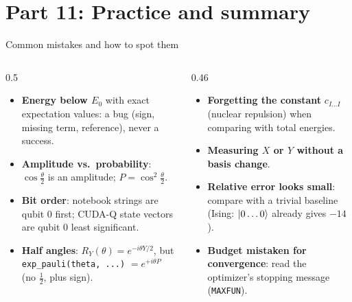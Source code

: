 \documentclass[aspectratio=169,11pt]{beamer}
\newcommand{\key}[1]{{\color{qdark}\textbf{#1}}}
\begin{document}
\section{Part 11: Practice and summary}
\begin{frame}{Common mistakes and how to spot them}
  \begin{columns}[T]
    \begin{column}{0.5\textwidth}
      \small
      \begin{itemize}
        \item \key{Energy below $E_0$} with exact expectation values: a bug (sign, missing term, reference), never a success.
        \item \key{Amplitude vs.\ probability}: $\cos\frac\theta2$ is an amplitude; $P = \cos^2\frac\theta2$.
        \item \key{Bit order}: notebook strings are qubit 0 first; CUDA-Q state vectors are qubit 0 least significant.
        \item \key{Half angles}: $R_Y(\theta) = e^{-i\theta Y/2}$, but \texttt{exp\_pauli(theta, ...)} $= e^{+i\theta P}$ (no $\frac12$, plus sign).
      \end{itemize}
    \end{column}
    \begin{column}{0.46\textwidth}
      \small
      \begin{itemize}
        \item \key{Forgetting the constant} $c_{I\dots I}$ (nuclear repulsion) when comparing with total energies.
        \item \key{Measuring $X$ or $Y$ without a basis change}.
        \item \key{Relative error looks small}: compare with a trivial baseline (Ising: $\ket{0\dots0}$ already gives $-14$).
        \item \key{Budget mistaken for convergence}: read the optimizer's stopping message (\texttt{MAXFUN}).
      \end{itemize}
    \end{column}
  \end{columns}
\end{frame}
\end{document}
